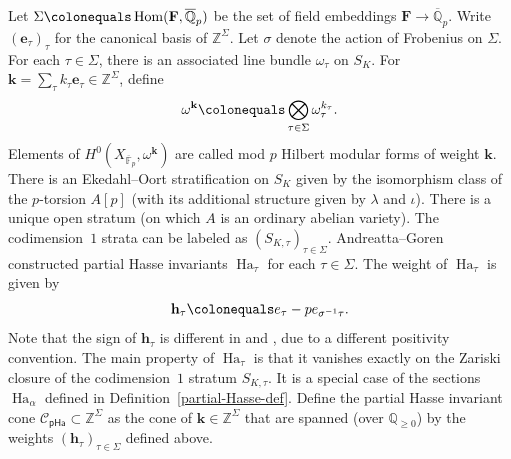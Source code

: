 \documentclass[11pt]{amsart}
\numberwithin{equation}{section}
\theoremstyle{definition}
\theoremstyle{remark}
\newcommand{\pha}{\mathsf{pHa}}
\newcommand{\Ccal}{{\mathcal C}}
\newcommand{\FF}{\mathbb{F}}
\newcommand{\QQ}{\mathbb{Q}}
\newcommand{\ZZ}{\mathbb{Z}}
\DeclareMathOperator{\Hom}{Hom}
\DeclareMathOperator{\Ha}{Ha}
\begin{document}
Let $\Sigma\colonequals \Hom(\mathbf{F},\overline{\QQ}_p)$ be the set of field embeddings $\mathbf{F}\to \overline{\QQ}_p$. Write $(\mathbf{e}_\tau)_\tau$ for the canonical basis of $\ZZ^\Sigma$. Let $\sigma$ denote the action of Frobenius on $\Sigma$. For each $\tau\in \Sigma$, there is an associated line bundle $\omega_\tau$ on $S_K$. For $\mathbf{k}=\sum_\tau k_\tau \mathbf{e}_\tau\in \ZZ^\Sigma$, define
\begin{equation}
\omega^\mathbf{k}\colonequals \bigotimes_{\tau\in \Sigma}\omega_{\tau}^{k_\tau}.    
\end{equation}
Elements of $H^0(X_{\overline{\FF}_p},\omega^\mathbf{k})$ are called mod $p$ Hilbert modular forms of weight $\mathbf{k}$. There is an Ekedahl--Oort stratification on $S_K$ given by the isomorphism class of the $p$-torsion $A[p]$ (with its additional structure given by $\lambda$ and $\iota$). There is a unique open stratum (on which $A$ is an ordinary abelian variety). The codimension~$1$ strata can be labeled as $(S_{K,\tau})_{\tau\in \Sigma}$. Andreatta--Goren \cite{Andreatta-Goren-book} constructed partial Hasse invariants $\Ha_{\tau}$ for each $\tau\in \Sigma$. The weight of $\Ha_{\tau}$ is given by
\begin{equation}
    \mathbf{h}_\tau \colonequals e_{\tau}-pe_{\sigma^{-1} \tau}.
\end{equation}
Note that the sign of $\mathbf{h}_\tau$ is different in \cite{Andreatta-Goren-book} and \cite{Diamond-Kassaei-comp-minimal}, due to a different positivity convention. The main property of $\Ha_{\tau}$ is that it vanishes exactly on the Zariski closure of the codimension~$1$ stratum $S_{K,\tau}$. It is a special case of the sections $\Ha_{\alpha}$ defined in Definition~\ref{partial-Hasse-def}. Define the partial Hasse invariant cone $\Ccal_{\pha}\subset \ZZ^\Sigma$ as the cone of $\mathbf{k}\in \ZZ^{\Sigma}$ that are spanned (over $\QQ_{\geq 0}$) by the weights $(\mathbf{h}_\tau)_{\tau\in \Sigma}$ defined above.
\end{document}
